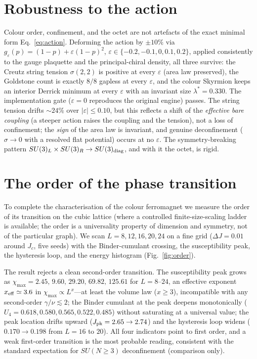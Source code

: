 \documentclass[aps,prd,reprint,nofootinbib,superscriptaddress,floatfix]{revtex4-2}
\begin{document}
\section{Robustness to the action}\label{sec:robust}

Colour order, confinement, and the octet are not artefacts of the exact minimal form
Eq.~\eqref{eq:action}. Deforming the action by $\pm10\%$ via
$g_\varepsilon(p)=(1-p)+\varepsilon(1-p)^2$, $\varepsilon\in\{-0.2,-0.1,0,0.1,0.2\}$,
applied consistently to the gauge plaquette and the principal-chiral density, all three
survive: the Creutz string tension $\sigma(2,2)$ is positive at every $\varepsilon$
(area law preserved), the Goldstone count is exactly $8/8$ gapless at every $\varepsilon$,
and the colour Skyrmion keeps an interior Derrick minimum at every $\varepsilon$ with an
invariant size $\lambda^\ast=0.330$. The implementation gate ($\varepsilon=0$ reproduces the
original engine) passes. The string tension drifts $\sim24\%$ over $|\varepsilon|\le0.10$,
but this reflects a shift of the \emph{effective bare coupling} (a steeper action raises
the coupling and the tension), not a loss of confinement; the \emph{sign} of the area law
is invariant, and genuine deconfinement ($\sigma\to0$ with a resolved flat potential)
occurs at no $\varepsilon$. The symmetry-breaking pattern $SU(3)_L\times SU(3)_R\to
SU(3)_{\rm diag}$, and with it the octet, is rigid.

\section{The order of the phase transition}\label{sec:order}

To complete the characterisation of the colour ferromagnet we measure the order of its
transition on the cubic lattice (where a controlled finite-size-scaling ladder is
available; the order is a universality property of dimension and symmetry, not of the
particular graph). We scan $L=8,12,16,20,24$ on a fine grid ($\Delta J=0.01$ around
$J_c$, five seeds) with the Binder-cumulant crossing, the susceptibility peak, the
hysteresis loop, and the energy histogram (Fig.~\ref{fig:order}).

The result rejects a clean second-order transition. The susceptibility peak grows as
$\chi_{\max}=2.45,\,9.60,\,29.20,\,69.82,\,125.61$ for $L=8$--$24$, an effective exponent
$x_{\rm eff}\simeq3.6$ in $\chi_{\max}\propto L^{x}$---at least the volume law ($x\ge3$),
incompatible with any second-order $\gamma/\nu\lesssim2$; the Binder cumulant at the peak
deepens monotonically ($U_4=0.618,0.580,0.565,0.522,0.485$) without saturating at a
universal value; the peak location drifts upward ($J_{\rm pk}=2.65\to2.74$) and the
hysteresis loop widens ($0.170\to0.198$ from $L=16$ to $20$). All four indicators point
to first order, and a weak first-order transition is the most probable reading,
consistent with the standard expectation for $SU(N\ge3)$ deconfinement
(comparison only).
\end{document}
